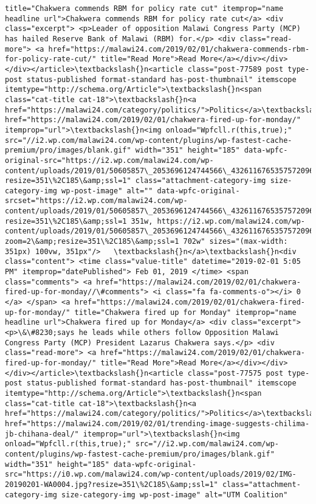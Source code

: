 \documentclass[11pt]{article}
\begin{document}
\begin{Verbatim}[commandchars=\\\{\}]
title="Chakwera commends RBM for policy rate cut" itemprop="name headline url">Chakwera commends RBM for policy rate cut</a> <div class="excerpt"> <p>Leader of opposition Malawi Congress Party (MCP) has hailed Reserve Bank of Malawi (RBM) for.</p> <div class="read-more"> <a href="https://malawi24.com/2019/02/01/chakwera-commends-rbm-for-policy-rate-cut/" title="Read More">Read More</a></div></div></div></article>\textbackslash{}n<article class="post-77589 post type-post status-published format-standard has-post-thumbnail" itemscope itemtype="http://schema.org/Article">\textbackslash{}n<span class="cat-title cat-18">\textbackslash{}n<a href="https://malawi24.com/category/politics/">Politics</a>\textbackslash{}n</span>\textbackslash{}n<a href="https://malawi24.com/2019/02/01/chakwera-fired-up-for-monday/" itemprop="url">\textbackslash{}n<img onload="Wpfcll.r(this,true);" src="//i2.wp.com/malawi24.com/wp-content/plugins/wp-fastest-cache-premium/pro/images/blank.gif" width="351" height="185" data-wpfc-original-src="https://i2.wp.com/malawi24.com/wp-content/uploads/2019/01/50605857\_2053696124744566\_4326116765357572096\_n.jpg?resize=351\%2C185\&amp;ssl=1" class="attachment-category-img size-category-img wp-post-image" alt="" data-wpfc-original-srcset="https://i2.wp.com/malawi24.com/wp-content/uploads/2019/01/50605857\_2053696124744566\_4326116765357572096\_n.jpg?resize=351\%2C185\&amp;ssl=1 351w, https://i2.wp.com/malawi24.com/wp-content/uploads/2019/01/50605857\_2053696124744566\_4326116765357572096\_n.jpg?zoom=2\&amp;resize=351\%2C185\&amp;ssl=1 702w" sizes="(max-width: 351px) 100vw, 351px"/>   \textbackslash{}n</a>\textbackslash{}n<div class="content"> <time class="value-title" datetime="2019-02-01 5:05 PM" itemprop="datePublished"> Feb 01, 2019 </time> <span class="comments"> <a href="https://malawi24.com/2019/02/01/chakwera-fired-up-for-monday//\#comments"> <i class="fa fa-comments-o"></i> 0 </a> </span> <a href="https://malawi24.com/2019/02/01/chakwera-fired-up-for-monday/" title="Chakwera fired up for Monday" itemprop="name headline url">Chakwera fired up for Monday</a> <div class="excerpt"> <p>\&\#8230;says he leads while others follow Opposition Malawi Congress Party (MCP) President Lazarus Chakwera says.</p> <div class="read-more"> <a href="https://malawi24.com/2019/02/01/chakwera-fired-up-for-monday/" title="Read More">Read More</a></div></div></div></article>\textbackslash{}n<article class="post-77575 post type-post status-published format-standard has-post-thumbnail" itemscope itemtype="http://schema.org/Article">\textbackslash{}n<span class="cat-title cat-18">\textbackslash{}n<a href="https://malawi24.com/category/politics/">Politics</a>\textbackslash{}n</span>\textbackslash{}n<a href="https://malawi24.com/2019/02/01/trending-image-suggests-chilima-jb-chihana-deal/" itemprop="url">\textbackslash{}n<img onload="Wpfcll.r(this,true);" src="//i2.wp.com/malawi24.com/wp-content/plugins/wp-fastest-cache-premium/pro/images/blank.gif" width="351" height="185" data-wpfc-original-src="https://i0.wp.com/malawi24.com/wp-content/uploads/2019/02/IMG-20190201-WA0004.jpg?resize=351\%2C185\&amp;ssl=1" class="attachment-category-img size-category-img wp-post-image" alt="UTM Coalition" 
\end{Verbatim}
\end{document}

